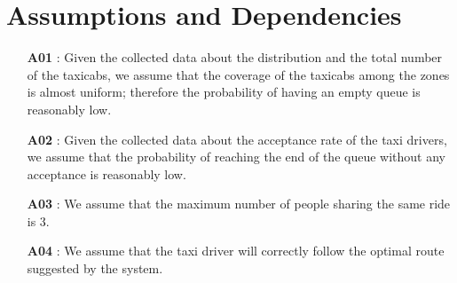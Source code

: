 \section{Assumptions and Dependencies} \label{assump}
\begin{itemize}
	\item [\textbf{A01}]: Given the collected data about the distribution and the total number of the taxicabs, we assume that the coverage of the taxicabs among the zones is almost uniform; therefore the probability of having an empty queue is reasonably low.
	\item [\textbf{A02}]: Given the collected data about the acceptance rate of the taxi drivers, we assume that the probability of reaching the end of the queue without any acceptance is reasonably low.
	\item [\textbf{A03}]: We assume that the maximum number of people sharing the same ride is 3.
	\item [\textbf{A04}]: We assume that the taxi driver will correctly follow the optimal route suggested by the system.
\end{itemize}